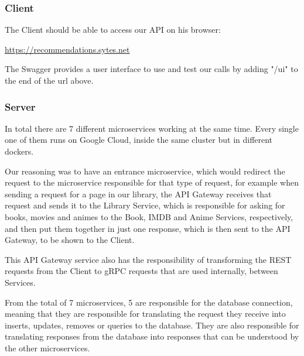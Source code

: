\documentclass[oneside]{article}
\newcommand*\fpar{\hspace{1ex}}
\begin{document}
    \subsubsection{Client}
    \fpar The Client should be able to access our API on his browser:
    \begin{center}
      \url{https://recommendations.sytes.net}
    \end{center}
    \par The Swagger provides a user interface to use and test our calls by adding "/ui" to the end of the url above.

    \subsubsection{Server}
    \fpar In total there are 7 different microservices working at the same time. Every single one of them runs on Google Cloud, inside the same cluster but in different dockers.
    \par Our reasoning was to have an entrance microservice, which would redirect the request to the microservice responsible for that type of request, for example when sending a request for a page in our library, the API Gateway receives that request and sends it to the Library Service, which is responsible for asking for books, movies and animes to the Book, IMDB and Anime Services, respectively, and then put them together in just one response, which is then sent to the API Gateway, to be shown to the Client.
    \par This API Gateway service also has the responsibility of transforming the REST requests from the Client to gRPC requests that are used internally, between Services.
    \par From the total of 7 microservices, 5 are responsible for the database connection, meaning that they are responsible for translating the request they receive into inserts, updates, removes or queries to the database. They are also responsible for translating responses from the database into responses that can be understood by the other microservices.
\end{document}
